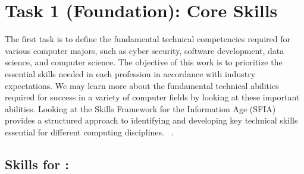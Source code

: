 \documentclass[a4paper, 11pt]{report}
\begin{document}

\tableofcontents



\newpage
\section{Task 1 (Foundation): Core Skills}

The first task is to define the fundamental technical competencies required for various computer majors, such as cyber security, software development, data science, and computer science. The objective of this work is to prioritize the essential skills needed in each profession in accordance with industry expectations. We may learn more about the fundamental technical abilities required for success in a variety of computer fields by looking at these important abilities. Looking at the Skills Framework for the Information Age (SFIA) provides a structured approach to identifying and developing key technical skills essential for different computing disciplines. ~\cite{sfia}. 




\subsection{Skills for \majA: \studA}
\end{document}
